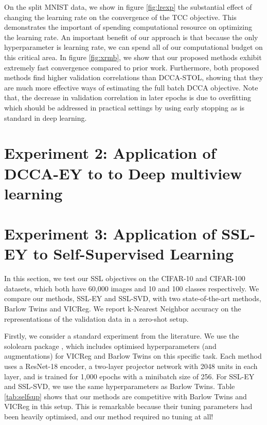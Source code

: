 On the split MNIST data, we show in figure \ref{fig:lrexp} the substantial effect of changing the learning rate on the convergence of the TCC objective. This demonstrates the important of spending computational resource on optimizing the learning rate. An important benefit of our approach is that because the only hyperparameter is learning rate, we can spend all of our computational budget on this critical area. In figure \ref{fig:xrmb}, we show that our proposed methods exhibit extremely fast convergence compared to prior work. Furthermore, both proposed methods find higher validation correlations than DCCA-STOL, showing that they are much more effective ways of estimating the full batch DCCA objective. Note that, the decrease in validation correlation in later epochs is due to overfitting which should be addressed in practical settings by using early stopping as is standard in deep learning.


\section{Experiment 2: Application of DCCA-EY to to Deep multiview learning}

\section{Experiment 3: Application of SSL-EY to Self-Supervised Learning}

In this section, we test our SSL objectives on the CIFAR-10 and CIFAR-100 datasets, which both have 60,000 images and 10 and 100 classes respectively. We compare our methods, SSL-EY and SSL-SVD, with two state-of-the-art methods, Barlow Twins and VICReg. We report k-Nearest Neighbor accuracy on the representations of the validation data in a zero-shot setup.

Firstly, we consider a standard experiment from the literature.
We use the sololearn package \cite{da2022solo}, which includes optimised hyperparameters (and augmentations) for VICReg and Barlow Twins on this specific task.
Each method uses a ResNet-18 encoder, a two-layer projector network with 2048 units in each layer, and is trained for 1,000 epochs with a minibatch size of 256.
For SSL-EY and SSL-SVD, we use the same hyperparameters as Barlow Twins.  
Table \ref{tab:selfsup} shows that our methods are competitive with Barlow Twins and VICReg in this setup.
This is remarkable because their tuning parameters had been heavily optimised, and our method required no tuning at all!


